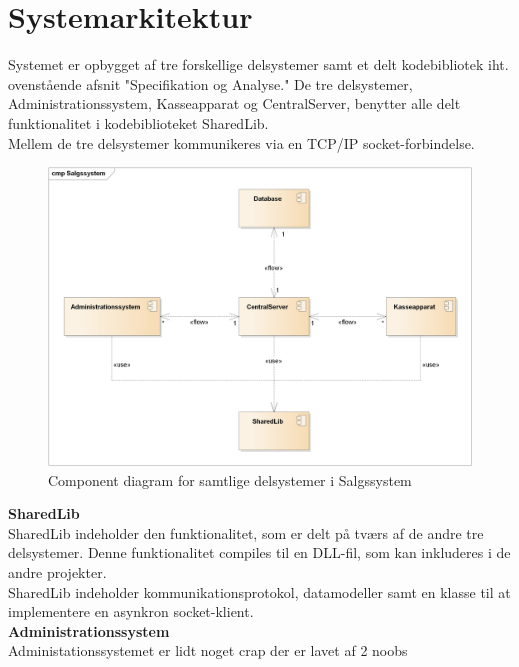 \section{Systemarkitektur}
Systemet er opbygget af tre forskellige delsystemer samt et delt kodebibliotek iht. ovenstående afsnit "Specifikation og Analyse." De tre delsystemer, Administrationssystem, Kasseapparat og CentralServer, benytter alle delt funktionalitet i kodebiblioteket SharedLib.\\

Mellem de tre delsystemer kommunikeres via en TCP/IP socket-forbindelse.

\begin{figure}[H]
    \centering
    \includegraphics[width=1\textwidth]{Projektbeskrivelse/Systemarkitektur/Components.png}
    \caption{Component diagram for samtlige delsystemer i Salgssystem}
    \label{fig:CSLogging}
\end{figure}


\textbf{SharedLib}\\
SharedLib indeholder den funktionalitet, som er delt på tværs af de andre tre delsystemer. Denne funktionalitet compiles til en DLL-fil, som kan inkluderes i de andre projekter.\\

SharedLib indeholder kommunikationsprotokol, datamodeller samt en klasse til at implementere en asynkron socket-klient.\\

\textbf{Administrationssystem}\\
Administationssystemet er lidt noget crap der er lavet af 2 noobs\\

